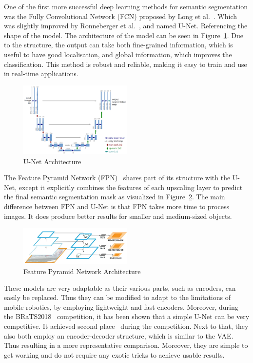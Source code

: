 One of the first more successful deep learning methods for semantic segmentation was the Fully Convolutional Network (FCN) proposed by Long et al.~\cite{long2015fully}. Which was slightly improved by Ronneberger et al.~\cite{ronneberger2015u}, and named U-Net. Referencing the shape of the model. The architecture of the model can be seen in Figure~\ref{fig:unet-architecture}. Due to the structure, the output can take both fine-grained information, which is useful to have good localisation, and global information, which improves the classification. This method is robust and reliable, making it easy to train and use in real-time applications.
\begin{figure}[ht]
    \centering
    \includegraphics[width=0.5\textwidth]{figures/unet-architecture.png}
    \caption{U-Net Architecture~\cite{ronneberger2015u}}
    \label{fig:unet-architecture}
\end{figure}

The Feature Pyramid Network (FPN)~\cite{lin2017feature} shares part of its structure with the U-Net, except it explicitly combines the features of each upscaling layer to predict the final semantic segmentation mask as visualized in Figure~\ref{fig:fpn-architecture}. The main difference between FPN and U-Net is that FPN takes more time to process images. It does produce better results for smaller and medium-sized objects.

\begin{figure}[ht]
    \centering
    \includegraphics[width=0.5\textwidth]{figures/fpn-architecture.png}
    \caption{Feature Pyramid Network Architecture~\cite{lin2017feature}}
    \label{fig:fpn-architecture}
\end{figure}

These models are very adaptable as their various parts, such as encoders, can easily be replaced. Thus they can be modified to adapt to the limitations of mobile robotics, by employing lightweight and fast encoders. Moreover, during the BRaTS2018~\cite{menze2014multimodal} competition, it has been shown that a simple U-Net can be very competitive. It achieved second place~\cite{DBLP:journals/corr/abs-1809-10483} during the competition. Next to that, they also both employ an encoder-decoder structure, which is similar to the VAE. Thus resulting in a more representative comparison. Moreover, they are simple to get working and do not require any exotic tricks to achieve usable results.
